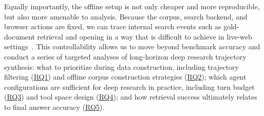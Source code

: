 
Equally importantly, the offline setup is not only cheaper and more reproducible, but also more amenable to analysis. Because the corpus, search backend, and browser actions are fixed, we can trace internal search events such as gold-document retrieval and opening in a way that is difficult to achieve in live-web settings~\citep{gao2025Asearcher, liu2025webexplorer, tang2025deepminer}. This controllability allows us to move beyond benchmark accuracy and conduct a series of targeted analyses of long-horizon deep research trajectory synthesis: what to prioritize during data construction, including trajectory filtering (\hyperref[subsec:ablation_rq1]{RQ1}) and offline corpus construction strategies (\hyperref[subsec:ablation_rq2]{RQ2}); which agent configurations are sufficient for deep research in practice, including turn budget (\hyperref[subsec:ablation_rq3]{RQ3}) and tool space design (\hyperref[subsec:ablation_rq4]{RQ4}); and how retrieval success ultimately relates to final answer accuracy (\hyperref[subsec:ablation_rq5]{RQ5}).



